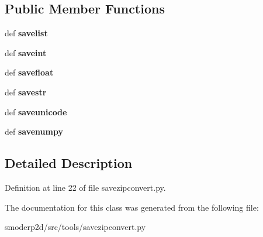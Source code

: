 \subsection*{Public Member Functions}
\begin{DoxyCompactItemize}
\item 
\hypertarget{classsmoderp2d_1_1src_1_1tools_1_1savezipconvert_1_1SaveItems_a88cd7dcb985be92294af1443ecf46573}{def {\bfseries savelist}}\label{classsmoderp2d_1_1src_1_1tools_1_1savezipconvert_1_1SaveItems_a88cd7dcb985be92294af1443ecf46573}

\item 
\hypertarget{classsmoderp2d_1_1src_1_1tools_1_1savezipconvert_1_1SaveItems_abffb863fffb5c4184101afdb2c343119}{def {\bfseries saveint}}\label{classsmoderp2d_1_1src_1_1tools_1_1savezipconvert_1_1SaveItems_abffb863fffb5c4184101afdb2c343119}

\item 
\hypertarget{classsmoderp2d_1_1src_1_1tools_1_1savezipconvert_1_1SaveItems_a89063838b17949e6152947ce1f3ef90b}{def {\bfseries savefloat}}\label{classsmoderp2d_1_1src_1_1tools_1_1savezipconvert_1_1SaveItems_a89063838b17949e6152947ce1f3ef90b}

\item 
\hypertarget{classsmoderp2d_1_1src_1_1tools_1_1savezipconvert_1_1SaveItems_a8b9a04c1bda1b67c17a8f680ab6a83c9}{def {\bfseries savestr}}\label{classsmoderp2d_1_1src_1_1tools_1_1savezipconvert_1_1SaveItems_a8b9a04c1bda1b67c17a8f680ab6a83c9}

\item 
\hypertarget{classsmoderp2d_1_1src_1_1tools_1_1savezipconvert_1_1SaveItems_a95863c1b617a2cfecf2502a1150651d8}{def {\bfseries saveunicode}}\label{classsmoderp2d_1_1src_1_1tools_1_1savezipconvert_1_1SaveItems_a95863c1b617a2cfecf2502a1150651d8}

\item 
\hypertarget{classsmoderp2d_1_1src_1_1tools_1_1savezipconvert_1_1SaveItems_a17acf5ee275ad2da8483d2624d983bf1}{def {\bfseries savenumpy}}\label{classsmoderp2d_1_1src_1_1tools_1_1savezipconvert_1_1SaveItems_a17acf5ee275ad2da8483d2624d983bf1}

\end{DoxyCompactItemize}


\subsection{Detailed Description}


Definition at line 22 of file savezipconvert.\-py.



The documentation for this class was generated from the following file\-:\begin{DoxyCompactItemize}
\item 
smoderp2d/src/tools/savezipconvert.\-py\end{DoxyCompactItemize}
